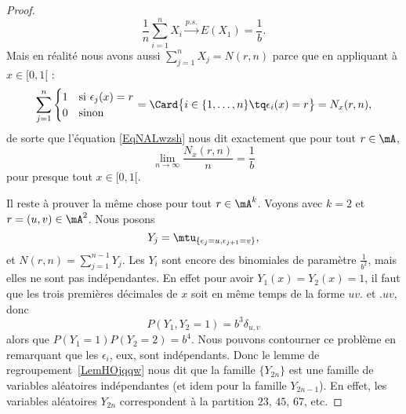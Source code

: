 \begin{proof}
	\begin{equation}    \label{EqNALwzsh}
		\frac{1}{n }\sum_{i=1}^nX_i\stackrel{p.s.}{\longrightarrow}E(X_1)=\frac{1}{ b }.
	\end{equation}
	Mais en réalité nous avons aussi \( \sum_{j=1}^nX_j=N(r,n)\) parce que en appliquant à \( x\in\mathopen[ 0 , 1 [\) :
	\begin{equation}
		\sum_{j=1}^n\begin{cases}
			1 & \text{si } \epsilon_j(x)=r \\
			0 & \text{sinon}
		\end{cases}
		=
		\Card\big\{  i\in\{ 1,\ldots, n \}\tq \epsilon_i(x)=r \big\}=N_x(r,n),
	\end{equation}
	de sorte que l'équation \eqref{EqNALwzsh} nous dit exactement que pour tout \( r\in \mA\),
	\begin{equation}
		\lim_{n\to \infty} \frac{ N_x(r,n) }{ n }=\frac{1}{ b }
	\end{equation}
	pour presque tout \( x\in\mathopen[ 0 , 1 [\).

	Il reste à prouver la même chose pour tout \( r\in\mA^k\). Voyons avec \( k=2\) et \( r=(u,v)\in\mA^2\). Nous posons
	\begin{equation}
		Y_j=\mtu_{\{ \epsilon_j=u,\epsilon_{j+1}=v \}},
	\end{equation}
	et \( N(r,n)=\sum_{j=1}^{n-1}Y_j\). Les \( Y_i\) sont encore des binomiales de paramètre \( \frac{1}{ b^2 }\), mais elles ne sont pas indépendantes. En effet pour avoir \( Y_1(x)=Y_2(x)=1\), il faut que les trois premières décimales de \( x\) soit en même temps de la forme \( uv.\) et \( .uv\), donc
	\begin{equation}
		P(Y_1,Y_2=1)=b^3\delta_{u,v}
	\end{equation}
	alors que \( P(Y_1=1)P(Y_2=2)=b^4\). Nous pouvons contourner ce problème en remarquant que les \( \epsilon_i\), eux, sont indépendants. Donc le lemme de regroupement~\ref{LemHOjqqw} nous dit que la famille \( \{ Y_{2n} \} \) est une famille de variables aléatoires indépendantes (et idem pour la famille \( Y_{2n-1}\)). En effet, les variables aléatoires \( Y_{2n}\) correspondent à la partition \( 23\), \( 45\), \( 67\), etc.


\end{proof}
